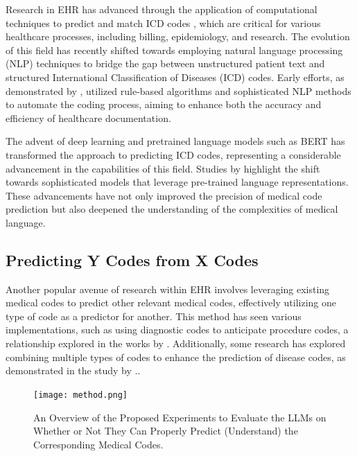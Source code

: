 \documentclass[11pt]{article}
\theoremstyle{plain}
\theoremstyle{definition}
\theoremstyle{remark}
\begin{document}
Research in EHR has advanced through the application of computational techniques to predict and match ICD codes \citep{lita2008large, parr2018automated}, which are critical for various healthcare processes, including billing, epidemiology, and research. The evolution of this field has recently shifted towards employing natural language processing (NLP) techniques to bridge the gap between unstructured patient text and structured International Classification of Diseases (ICD) codes. Early efforts, as demonstrated by \citep{singaravelan2021predicting, atutxa2017machine, jay2019construction, mullenbach2018explainable, uzuner2010extracting, spasic2010medication, kavuluru2015empirical}, utilized rule-based algorithms and sophisticated NLP methods to automate the coding process, aiming to enhance both the accuracy and efficiency of healthcare documentation.

The advent of deep learning and pretrained language models such as BERT has  transformed the approach to predicting ICD codes, representing a considerable advancement in the capabilities of this field. Studies by \citep{samonte2018icd, chen2019automatic, huang2022plm, amin2019mlt} highlight the shift towards sophisticated models that leverage pre-trained language representations. These advancements have not only improved the precision of medical code prediction but also deepened the understanding of the complexities of medical language.

\subsection{Predicting Y Codes from X Codes}

Another popular avenue of research within EHR involves leveraging existing medical codes to predict other relevant medical codes, effectively utilizing one type of code as a predictor for another. This method has seen various implementations, such as using diagnostic codes to anticipate procedure codes, a relationship explored in the works by \citep{subotin2014system, haq2017intelligent}. Additionally, some research has explored combining multiple types of codes to enhance the prediction of disease codes, as demonstrated in the study by \citep{djennaoui2015improvement}.. 

 \begin{figure}[t]
   \centering 
   \texttt{[image: method.png]} 
   \caption{An Overview of the Proposed Experiments to Evaluate the LLMs on Whether or Not They Can Properly Predict (Understand) the Corresponding Medical Codes.}
   \label{fig11} 
 \end{figure} 
\end{document}
